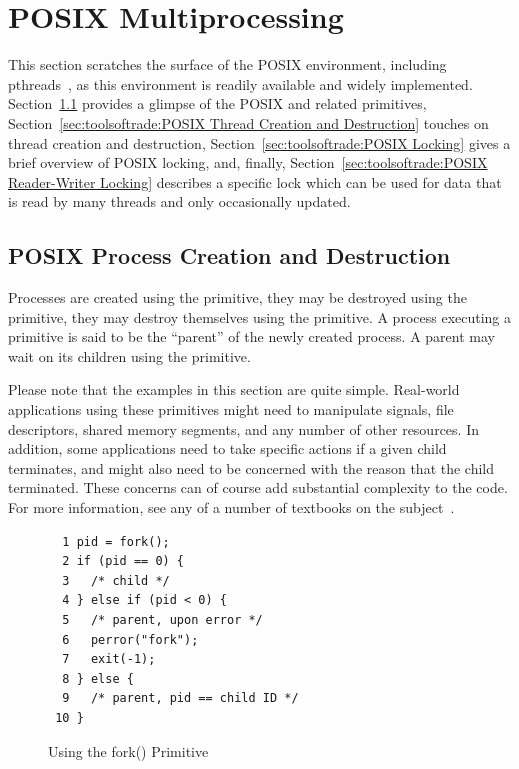 \section{POSIX Multiprocessing}
\label{sec:toolsoftrade:POSIX Multiprocessing}

This section scratches the surface of the
POSIX environment, including pthreads~\cite{OpenGroup1997pthreads},
as this environment is readily available and widely implemented.
Section~\ref{sec:toolsoftrade:POSIX Process Creation and Destruction}
provides a glimpse of the POSIX  and related primitives,
Section~\ref{sec:toolsoftrade:POSIX Thread Creation and Destruction}
touches on thread creation and destruction,
Section~\ref{sec:toolsoftrade:POSIX Locking} gives a brief overview
of POSIX locking, and, finally,
Section~\ref{sec:toolsoftrade:POSIX Reader-Writer Locking} describes a
specific lock which can be used for data that is read by many threads and only
occasionally updated.

\subsection{POSIX Process Creation and Destruction}
\label{sec:toolsoftrade:POSIX Process Creation and Destruction}

Processes are created using the  primitive, they may
be destroyed using the  primitive, they may destroy
themselves using the  primitive.
A process executing a  primitive is said to be the ``parent''
of the newly created process.
A parent may wait on its children using the  primitive.

Please note that the examples in this section are quite simple.
Real-world applications using these primitives might need to manipulate
signals, file descriptors, shared memory segments, and any number of
other resources.
In addition, some applications need to take specific actions if a given
child terminates, and might also need to be concerned with the reason
that the child terminated.
These concerns can of course add substantial complexity to the code.
For more information, see any of a number of textbooks on the
subject~\cite{WRichardStevens1992,StewartWeiss2013UNIX}.

\begin{figure}[tbp]
{ \scriptsize
\begin{verbatim}
  1 pid = fork();
  2 if (pid == 0) {
  3   /* child */
  4 } else if (pid < 0) {
  5   /* parent, upon error */
  6   perror("fork");
  7   exit(-1);
  8 } else {
  9   /* parent, pid == child ID */
 10 }
\end{verbatim}
}
\caption{Using the fork() Primitive}
\label{fig:toolsoftrade:Using the fork() Primitive}
\end{figure}

